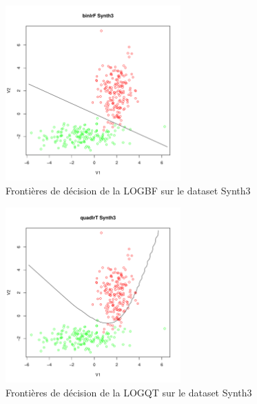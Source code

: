 \documentclass{report}
\begin{document}
\begin{figure}[ht!]
\begin{center}
    \includegraphics[width=0.6\textwidth]{results/binlrf/binlrf-Synth3.pdf}
    \caption{Frontières de décision de la LOGBF sur le dataset Synth3}
\end{center}
\end{figure}

\begin{figure}[ht!]
\begin{center}
    \includegraphics[width=0.6\textwidth]{results/quadlrt/quadlrt-Synth3.pdf}
    \caption{Frontières de décision de la LOGQT sur le dataset Synth3}
\end{center}
\end{figure}
\end{document}
